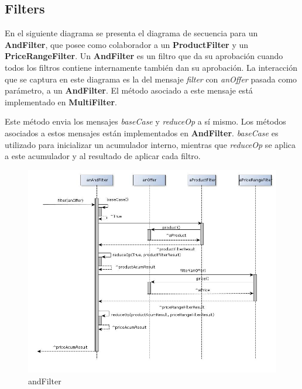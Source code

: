 \documentclass[10pt, a4paper]{article}
\begin{document}
\subsection{Filters}

En el siguiente diagrama se presenta el diagrama de secuencia para un \textbf{AndFilter}, que posee como colaborador a un \textbf{ProductFilter} y un \textbf{PriceRangeFilter}. Un \textbf{AndFilter} es un filtro que da su aprobación cuando todos los filtros contiene internamente también dan su aprobación. La interacción que se captura en este diagrama es la del mensaje \emph{filter} con \emph{anOffer} pasada como parámetro, a un \textbf{AndFilter}. El método asociado a este mensaje está implementado en \textbf{MultiFilter}. 

 Este método envia los mensajes \emph{baseCase} y \emph{reduceOp} a sí mismo. Los métodos asociados a estos mensajes están implementados en \textbf{AndFilter}. \emph{baseCase} es utilizado para inicializar un acumulador interno, mientras que \emph{reduceOp} se aplica a este acumulador y al resultado de aplicar cada filtro.
\begin{figure}[H]
\centering
\includegraphics[scale=0.55]{graphics/andFilter_sequence.jpg}
\caption{andFilter}
\end{figure}
 
% 
\end{document}
